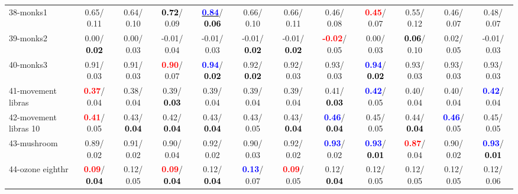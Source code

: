 \begin{table}[h]
\begin{center}
{\begin{tabular}{lc|c|c|c|c|c|c|c|c|c|c}
38-monks1 &   0.65/  0.11 &   0.64/  0.10 & \textcolor{black}{\textbf{  0.72}}/  0.09 & \underline{\textcolor{blue}{\textbf{  0.84}}}/\textcolor{black}{\textbf{  0.06}} &   0.66/  0.10 &   0.66/  0.11 &   0.46/  0.08 & \textcolor{red}{\textbf{  0.45}}/  0.07 &   0.55/  0.12 &   0.46/  0.07 &   0.48/  0.07 \\
39-monks2 &   0.00/\textcolor{black}{\textbf{  0.02}} &   0.00/  0.03 &  -0.01/  0.04 &  -0.01/  0.03 &  -0.01/\textcolor{black}{\textbf{  0.02}} &  -0.01/\textcolor{black}{\textbf{  0.02}} & \textcolor{red}{\textbf{ -0.02}}/  0.05 &   0.00/  0.03 & \textcolor{black}{\textbf{  0.06}}/  0.10 &   0.02/  0.05 &  -0.01/  0.03 \\ \hline
40-monks3 &   0.91/  0.03 &   0.91/  0.03 & \textcolor{red}{\textbf{  0.90}}/  0.07 & \textcolor{blue}{\textbf{  0.94}}/\textcolor{black}{\textbf{  0.02}} &   0.92/\textcolor{black}{\textbf{  0.02}} &   0.92/  0.03 &   0.93/  0.03 & \textcolor{blue}{\textbf{  0.94}}/\textcolor{black}{\textbf{  0.02}} &   0.93/  0.03 &   0.93/  0.03 &   0.93/  0.03 \\
41-movement libras & \textcolor{red}{\textbf{  0.37}}/  0.04 &   0.38/  0.04 &   0.39/\textcolor{black}{\textbf{  0.03}} &   0.39/  0.04 &   0.39/  0.04 &   0.39/  0.04 &   0.41/\textcolor{black}{\textbf{  0.03}} & \textcolor{blue}{\textbf{  0.42}}/  0.05 &   0.40/  0.04 &   0.40/  0.04 & \textcolor{blue}{\textbf{  0.42}}/  0.04 \\
42-movement libras 10 & \textcolor{red}{\textbf{  0.41}}/  0.05 &   0.43/\textcolor{black}{\textbf{  0.04}} &   0.42/\textcolor{black}{\textbf{  0.04}} &   0.43/\textcolor{black}{\textbf{  0.04}} &   0.43/  0.05 &   0.43/\textcolor{black}{\textbf{  0.04}} & \textcolor{blue}{\textbf{  0.46}}/\textcolor{black}{\textbf{  0.04}} &   0.45/  0.05 &   0.44/\textcolor{black}{\textbf{  0.04}} & \textcolor{blue}{\textbf{  0.46}}/  0.05 &   0.45/  0.05 \\
43-mushroom &   0.89/  0.02 &   0.91/  0.02 &   0.90/  0.04 &   0.92/  0.02 &   0.90/  0.03 &   0.92/  0.02 & \textcolor{blue}{\textbf{  0.93}}/  0.02 & \textcolor{blue}{\textbf{  0.93}}/\textcolor{black}{\textbf{  0.01}} & \textcolor{red}{\textbf{  0.87}}/  0.04 &   0.90/  0.02 & \textcolor{blue}{\textbf{  0.93}}/\textcolor{black}{\textbf{  0.01}} \\
44-ozone eighthr & \textcolor{red}{\textbf{  0.09}}/\textcolor{black}{\textbf{  0.04}} &   0.12/  0.05 & \textcolor{red}{\textbf{  0.09}}/\textcolor{black}{\textbf{  0.04}} &   0.12/\textcolor{black}{\textbf{  0.04}} & \textcolor{blue}{\textbf{  0.13}}/  0.07 & \textcolor{red}{\textbf{  0.09}}/  0.05 &   0.12/\textcolor{black}{\textbf{  0.04}} &   0.12/  0.05 &   0.12/  0.05 &   0.12/  0.05 &   0.12/  0.06 \\

\end{tabular}}
\end{center}
\end{table}
